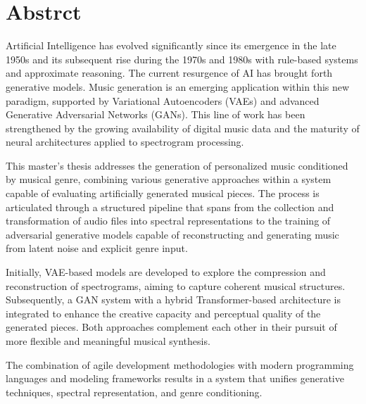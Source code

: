 \cleardoublepage

\chapter*{Abstrct}
\label{resumen}

Artificial Intelligence has evolved significantly since its emergence in the late 1950s and its subsequent rise during the 1970s and 1980s with rule-based systems and approximate reasoning. The current resurgence of AI has brought forth generative models. Music generation is an emerging application within this new paradigm, supported by Variational Autoencoders (VAEs) and advanced Generative Adversarial Networks (GANs). This line of work has been strengthened by the growing availability of digital music data and the maturity of neural architectures applied to spectrogram processing.
    
This master's thesis addresses the generation of personalized music conditioned by musical genre, combining various generative approaches within a system capable of evaluating artificially generated musical pieces. The process is articulated through a structured pipeline that spans from the collection and transformation of audio files into spectral representations to the training of adversarial generative models capable of reconstructing and generating music from latent noise and explicit genre input.

Initially, VAE-based models are developed to explore the compression and reconstruction of spectrograms, aiming to capture coherent musical structures. Subsequently, a GAN system with a hybrid Transformer-based architecture is integrated to enhance the creative capacity and perceptual quality of the generated pieces. Both approaches complement each other in their pursuit of more flexible and meaningful musical synthesis.

The combination of agile development methodologies with modern programming languages and modeling frameworks results in a system that unifies generative techniques, spectral representation, and genre conditioning.

